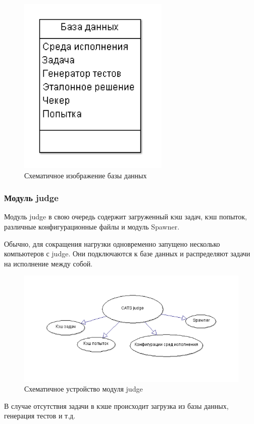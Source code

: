 \documentclass{imcs}
\begin{document}
\begin{figure}[htb]
\centering
\includegraphics{./img/db.png}
\caption{Схематичное изображение базы данных}
\label{dbfields}
\end{figure}

\FloatBarrier
\subsubsection{Модуль judge}
\FloatBarrier
Модуль judge\cite{rozhkov} в свою очередь содержит загруженный кэш задач, кэш попыток, различные конфигурационные файлы и модуль Spawner.

Обычно, для сокращения нагрузки одновременно запущено несколько компьютеров с judge. Они подключаются к базе данных и распределяют задачи на исполнение между собой.

\begin{figure}[htb]
\centering
\includegraphics{./img/judge.png}
\caption{Схематичное устройство модуля judge}
\label{judgemodule}
\end{figure}

\FloatBarrier
В случае отсутствия задачи в кэше происходит загрузка из базы данных, генерация тестов и т.д.
\end{document}
